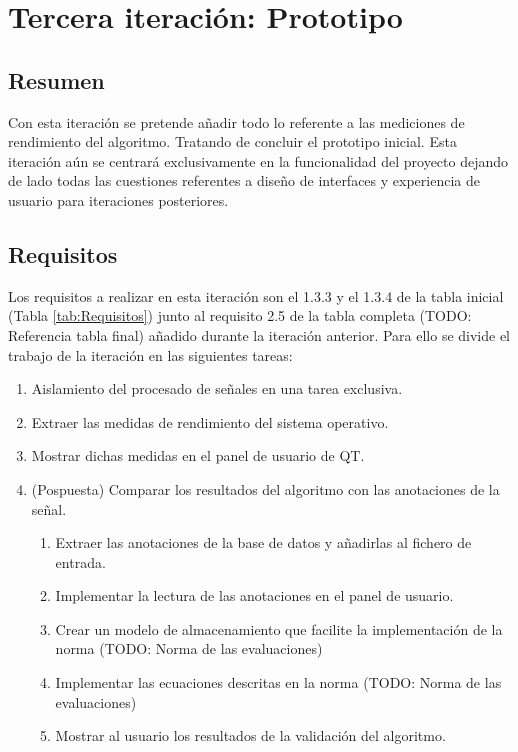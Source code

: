 
\section{Tercera iteración: Prototipo}
    \subsection{Resumen}
        
        Con esta iteración se pretende añadir todo lo referente a las mediciones de rendimiento del algoritmo. Tratando de concluir el prototipo inicial. Esta iteración aún se centrará exclusivamente en la funcionalidad del proyecto dejando de lado todas las cuestiones referentes a diseño de interfaces y experiencia de usuario para iteraciones posteriores.
        
    \subsection{Requisitos}

        Los requisitos a realizar en esta iteración son el 1.3.3 y el 1.3.4 de la tabla inicial (Tabla \ref{tab:Requisitos}) junto al requisito 2.5 de la tabla completa (TODO: Referencia tabla final) añadido durante la iteración anterior. Para ello se divide el trabajo de la iteración en las siguientes tareas:

        \begin{enumerate}
            \item Aislamiento del procesado de señales en una tarea exclusiva.
            \item Extraer las medidas de rendimiento del sistema operativo.
            \item Mostrar dichas medidas en el panel de usuario de QT.
            \item (Pospuesta) Comparar los resultados del algoritmo con las anotaciones de la señal.
            \begin{enumerate}
                \item Extraer las anotaciones de la base de datos y añadirlas al fichero de entrada.
                \item Implementar la lectura de las anotaciones en el panel de usuario.
                \item Crear un modelo de almacenamiento que facilite la implementación de la norma (TODO: Norma de las evaluaciones)
                \item Implementar las ecuaciones descritas en la norma (TODO: Norma de las evaluaciones)
                \item Mostrar al usuario los resultados de la validación del algoritmo.
            \end{enumerate}
        \end{enumerate}
        
